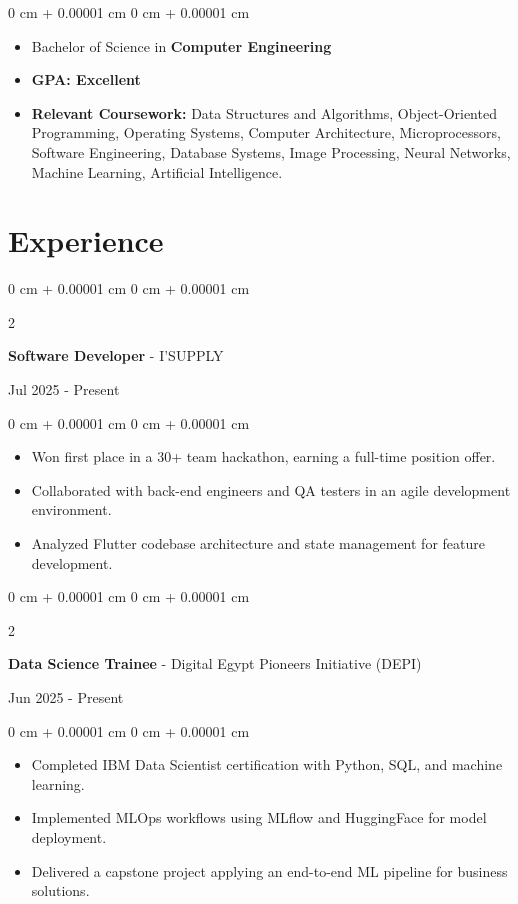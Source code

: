 \documentclass[10pt, letterpaper]{article}
\newenvironment{highlights}{
\begin{itemize}[
topsep=0.10 cm,
parsep=0.10 cm,
partopsep=0pt,
itemsep=0pt,
leftmargin=0 cm + 10pt
]
}{
\end{itemize}
} %
\newenvironment{onecolentry}{
\begin{adjustwidth}{
0 cm + 0.00001 cm
}{
0 cm + 0.00001 cm
}
}{
\end{adjustwidth}
} %
\newenvironment{twocolentry}[2][]{
\onecolentry
\def\secondColumn{#2}
\setcolumnwidth{\fill, 4.5 cm}
\begin{paracol}{2}
}{
\switchcolumn \raggedleft \secondColumn
\end{paracol}
\endonecolentry
} %
\begin{document}
\vspace{0.10cm}

\begin{onecolentry}
\begin{highlights}
\item Bachelor of Science in \textbf{Computer Engineering}
\item \textbf{GPA: Excellent}
\item \textbf{Relevant Coursework:} Data Structures and Algorithms, Object-Oriented Programming, Operating Systems, Computer Architecture, Microprocessors, Software Engineering, Database Systems, Image Processing, Neural Networks, Machine Learning, Artificial Intelligence.
\end{highlights}
\end{onecolentry}




\section{Experience}
\vspace{0.2cm}
\begin{twocolentry}{
Jul 2025 - Present
}
\textbf{\large Software Developer} - I'SUPPLY
\end{twocolentry}
\vspace{0.1 cm}

\begin{onecolentry}
\begin{highlights}
\item Won first place in a 30+ team hackathon, earning a full-time position offer.
\item Collaborated with back-end engineers and QA testers in an agile development environment.
\item Analyzed Flutter codebase architecture and state management for feature development.
\end{highlights}
\end{onecolentry}

\vspace{0.1cm}

\begin{twocolentry}{
Jun 2025 - Present
}
\textbf{\large Data Science Trainee} - Digital Egypt Pioneers Initiative (DEPI)
\end{twocolentry}

\vspace{0.1cm}

\begin{onecolentry}
\begin{highlights}
\item Completed IBM Data Scientist certification with Python, SQL, and machine learning.
\item Implemented MLOps workflows using MLflow and HuggingFace for model deployment.
\item Delivered a capstone project applying an end-to-end ML pipeline for business solutions.
\end{highlights}
\end{onecolentry}
\end{document}
